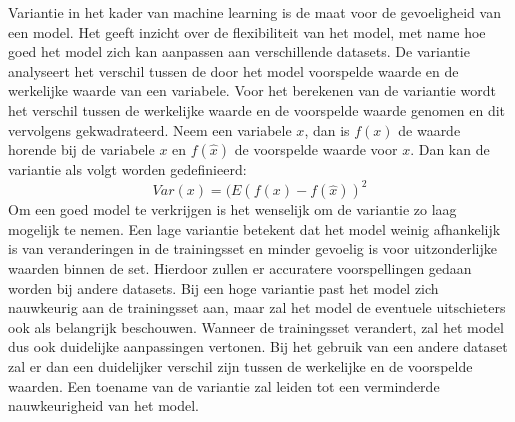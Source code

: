 \documentclass[TeamE-eindrapport]{subfiles}
\begin{document}
		
	Variantie in het kader van machine learning is de maat voor de gevoeligheid van een model. Het geeft inzicht over de flexibiliteit van      het model, met name hoe goed het model zich kan aanpassen aan verschillende datasets. De variantie analyseert het verschil tussen de        door het model voorspelde waarde en de werkelijke waarde van een variabele. Voor het berekenen van de variantie wordt het verschil          tussen de werkelijke waarde en de voorspelde waarde genomen en dit vervolgens gekwadrateerd. Neem een variabele \(x\), dan is \(f(x)\)      de waarde horende bij de variabele \(x\) en \(f(\hat{x})\) de voorspelde waarde voor \(x\). Dan kan de variantie als volgt worden           gedefinieerd:
	\[Var (x)= (E(f(x)- f(\hat{x}))^2\]
	Om een goed model te verkrijgen is het wenselijk om de variantie zo laag mogelijk te nemen. Een lage variantie betekent dat het model       weinig afhankelijk is van veranderingen in de trainingsset en minder gevoelig is voor uitzonderlijke waarden binnen de set.  Hierdoor       zullen er accuratere voorspellingen gedaan worden bij andere datasets.
	Bij een hoge variantie past het model zich nauwkeurig aan de trainingsset aan, maar zal het model de eventuele uitschieters ook als         belangrijk beschouwen. Wanneer de trainingsset verandert, zal het model dus ook duidelijke aanpassingen vertonen.  Bij het gebruik van      een andere dataset zal er dan  een duidelijker verschil zijn tussen de werkelijke en de voorspelde waarden. Een toename van de              variantie zal leiden tot een verminderde nauwkeurigheid van het model.
\end{document}
